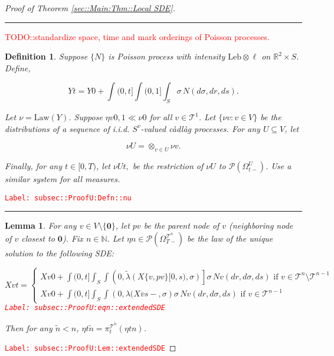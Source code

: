 \documentclass[12pt]{article}
\newcommand{\mb}{\mathbb}
\newcommand{\mc}{\mathcal}
\newcommand{\ov}{\overline}
\newcommand{\te}{\text}
\newcommand{\tr}{\textcolor{red}}
\newcommand{\labe}[1]{\tr{\texttt{Label: #1}}}
\newcommand{\lin}{\rule{\linewidth}{0.4 pt}}
\newcommand{\pmsr}{\mc{P}}							%
\renewcommand{\root}{\mathbf{0}}				%
\renewcommand{\v}{v}							%
\renewcommand{\U}{U}							%
\renewcommand{\S}{S}							%
\newcommand{\s}{\sigma}							%
\newcommand{\T}{T}								%
\renewcommand{\t}{t}							%
\newcommand{\sset}{\Omega}						%
\newcommand{\proj}{\pi}							%
\renewcommand{\tt}{s}							%
\newcommand{\X}{X}								%
\newcommand{\carp}[1]{^{#1}}					%
\newcommand{\vsi}[1]{^{#1}}						%
\newcommand{\cl}{\ov}							%
\newcommand{\ts}[1]{_{#1}}						%
\newcommand{\tree}{\mc{T}}						%
\newcommand{\sln}[1]{^{#1}}						%
\newcommand{\poiss}{N}							%
\newcommand{\leb}{\te{Leb}}						%
\newcommand{\Sm}{\ell}							%
\newcommand{\rate}{\lambda}						%
\renewcommand{\r}{r}							%
\newcommand{\alt}[1]{\widetilde{#1}}			%
\newcommand{\mm}{\nu}							%
\newcommand{\mmm}{\eta}							%
\newcommand{\law}{\te{Law}}						%
\newcommand{\XX}{Y}								%
\newcommand{\crate}{\alt{\lambda}}				%
\newcommand{\p}{p}								%
\newtheorem{lem}[thms]{Lemma}
\newtheorem{defn}[thms]{Definition}
\begin{document}
\begin{proof}[Proof of Theorem \ref{sec::Main:Thm::Local SDE}]
\lin

\tr{TODO::standardize space, time and mark orderings of Poisson processes.}

\begin{defn}
Suppose \(\{\poiss{}\}\) is Poisson process with intensity \(\leb\otimes \Sm\) on \(\mb{R}^2\times \S\). Define,

\[\XX{}{\t} = \XX{}{0} + \int{(0,\t]}\int{(0,1]}\int_\S\s\,\poiss{}(d\s,d\r,d\tt).\]

Let \(\mm{}{}{} = \law(\XX{}{})\). Suppose \(\mmm{\v}{0,}{1}\ll\mm{}{0}{}\) for all \(\v\in\tree\sln{1}\). Let \(\{\mm{\v}{}{}:\v\in V\}\) be the distributions of a sequence of i.i.d. \(\S\carp{\v}\)-valued c\`adl\`ag processes. For any \(\U\subseteq V\), let 

\[\mm{\U}{}{} = \otimes_{\v\in\U} \mm{\v}{}{}.\]

Finally, for any \(\t\in [0,\T)\), let \(\mm{\U}{\t,}{}\) be the restriction of \(\mm{\U}{}{}\) to \(\pmsr(\sset\vsi{\U}\ts{\t-})\). Use a similar system for all measures.
\label{subsec::ProofU:Defn::nu}
\end{defn}
\labe{subsec::ProofU:Defn::nu}

\lin

\begin{lem}
For any \(\v \in V\setminus\{\root\}\), let \(\p{\v}\) be the parent node of \(\v\) (neighboring node of \(\v\) closest to \(\root\)). Fix \(n \in \mb{N}\). Let \(\mmm{}{}{n} \in \pmsr\left(\sset\vsi{\tree\sln{n}}\ts{\T-}\right)\) be the law of the unique solution to the following SDE:

\begin{equation}
\X{\v}{\t} = \begin{cases}
\X{\v}{0} + \int{(0,\t]}\int_\S\int{\left(0,\crate{}{}(\X{\{\v,\p{\v}\}}{[0,\tt)},\s)\right]}\s\,\poiss{\v}(d\r,d\s,d\tt)\te{ if } \v \in \tree\sln{n}\setminus \tree\sln{n-1}\\
\X{\v}{0} + \int{(0,\t]}\int_\S\int{\left(0,\rate{}(\X{\cl{\v}}{\tt-},\s\right)}\s\,\poiss{\v}(d\r,d\s,d\tt)\te{ if } \v \in \tree\sln{n-1}
\end{cases}
\label{subsec::ProofU:eqn::extendedSDE}
\end{equation}
\labe{subsec::ProofU:eqn::extendedSDE}

Then for any \(\alt{n} < n\), \(\mmm{}{\t}{\alt{n}} = \proj\vsi{\tree\sln{\alt{n}}}\ts{\t}(\mmm{}{\t}{n})\).
\label{subsec::ProofU:Lem::extendedSDE}
\end{lem}
\labe{subsec::ProofU:Lem::extendedSDE}


\end{proof}
\end{document}
